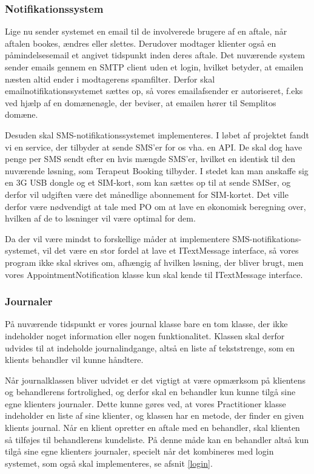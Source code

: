 \subsubsection{Notifikationssystem}

Lige nu sender systemet en email til de involverede brugere af en aftale, når aftalen bookes, ændres eller slettes.
Derudover modtager klienter også en påmindelsesemail et angivet tidspunkt inden deres aftale.
Det nuværende system sender emails gennem en  SMTP client uden et login, hvilket betyder, at emailen næsten altid ender i modtagerens spamfilter.
Derfor skal emailnotifikationssystemet sættes op, så vores emailafsender er autoriseret, f.eks ved hjælp af en domænenøgle, der beviser, at emailen hører til Semplitos domæne.

Desuden skal SMS-notifikationssystemet implementeres.
I løbet af projektet fandt vi en service, der tilbyder at sende SMS'er for os vha. en API.
De skal dog have penge per SMS sendt efter en hvis mængde SMS'er, hvilket en identisk til den nuværende løsning, som Terapeut Booking tilbyder.
I stedet kan man anskaffe sig en 3G USB dongle og et SIM-kort, som kan sættes op til at sende SMSer, og derfor vil udgiften være det månedlige abonnement for SIM-kortet.
Det ville derfor være nødvendigt at tale med PO om at lave en økonomisk beregning over, hvilken af de to løsninger vil være optimal for dem.

Da der vil være mindst to forskellige måder at implementere SMS-notifikations-systemet, vil det være en stor fordel at lave et ITextMessage interface, så vores program ikke skal skrives om, afhængig af hvilken løsning, der bliver brugt, men vores AppointmentNotification klasse kun skal kende til ITextMessage interface.

\subsubsection{Journaler}
På nuværende tidspunkt er vores journal klasse bare en tom klasse, der ikke indeholder noget information eller nogen funktionalitet.
Klassen skal derfor udvides til at indeholde journalindgange, altså en liste af tekststrenge, som en klients behandler vil kunne håndtere.

Når journalklassen bliver udvidet er det vigtigt at være opmærksom på klientens og behandlerens fortrolighed, og derfor skal en behandler kun kunne tilgå sine egne klienters journaler.
Dette kunne gøres ved, at vores Practitioner klasse indeholder en liste af sine klienter, og klassen har en metode, der finder en given klients journal.
Når en klient opretter en aftale med en behandler, skal klienten så tilføjes til behandlerens kundeliste.
På denne måde kan en behandler altså kun tilgå sine egne klienters journaler, specielt når det kombineres med login systemet, som også skal implementeres, se afsnit \ref{login}.

